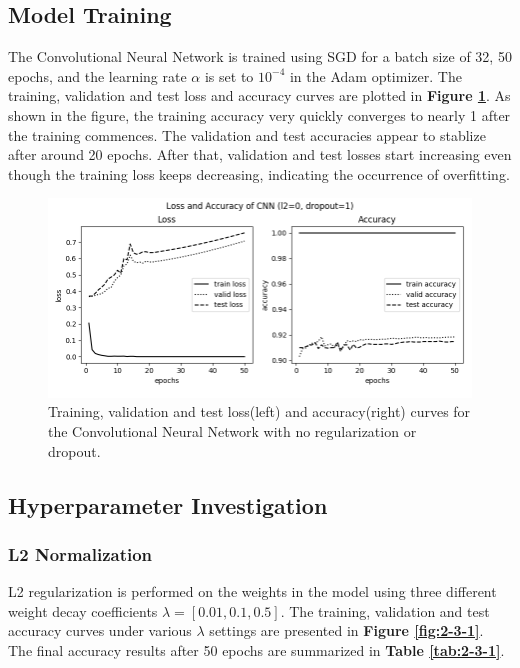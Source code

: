 \documentclass[12pt]{article}
\begin{document}
\subsection{Model Training}

The Convolutional Neural Network is trained using SGD for a batch size of 32, 50 epochs, and the learning rate $\alpha$  is set to $10^{-4}$ in the Adam optimizer. The training, validation and test loss and accuracy curves are plotted in \textbf{Figure \ref{fig:2-2}}. As shown in the figure, the training accuracy very quickly converges to nearly 1 after the training commences. The validation and test accuracies appear to stablize after around 20 epochs. After that, validation and test losses start increasing even though the training loss keeps decreasing, indicating the occurrence of overfitting.  

\begin{figure}[!htb]
\hspace*{-2cm}
\includegraphics[width=1.2\linewidth]{images/a2/2.2/loss.png}
\caption{Training, validation and test loss(left) and accuracy(right) curves for the Convolutional Neural Network with no regularization or dropout.}\label{fig:2-2}
\end{figure}

\bigskip
\subsection{Hyperparameter Investigation}

\subsubsection{L2 Normalization}

L2 regularization is performed on the weights in the model using three different weight decay coefficients $\lambda = [0.01, 0.1, 0.5]$. The training, validation and test accuracy curves under various $\lambda$  settings are presented in \textbf{Figure \ref{fig:2-3-1}}. The final accuracy results after 50 epochs are summarized in \textbf{Table \ref{tab:2-3-1}}.
\end{document}
